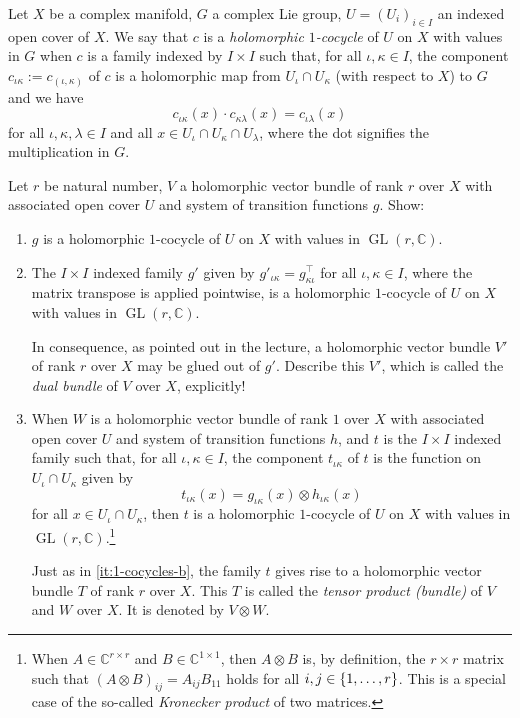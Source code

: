 \documentclass[a4paper]{amsart}
\newcommand{\C}{\mathbb{C}}
\theoremstyle{remark}
\numberwithin{equation}{question}
\DeclarePairedDelimiter\set{\{}{\}}
\DeclareMathOperator{\GL}{GL}
\begin{document}
\begin{question}[subtitle=Constructions with $1$-cocycles]
\label{qu:1-cocycles}
Let $X$ be a complex manifold, $G$ a complex Lie group, $U = (U_i)_{i \in I}$ an indexed open cover of $X$. We say that $c$ is a \emph{holomorphic $1$-cocycle} of $U$ on $X$ with values in $G$ when $c$ is a family indexed by $I \times I$ such that, for all $\iota,\kappa \in I$, the component $c_{\iota\kappa} := c_{(\iota,\kappa)}$ of $c$ is a holomorphic map from $U_\iota \cap U_\kappa$ (with respect to $X$) to $G$ and we have
\begin{equation}
\label{eq:1-cocycles}
c_{\iota\kappa}(x) \cdot c_{\kappa\lambda}(x) = c_{\iota\lambda}(x)
\end{equation}
for all $\iota,\kappa,\lambda \in I$ and all $x \in U_\iota \cap U_\kappa \cap U_\lambda$, where the dot signifies the multiplication in $G$.

Let $r$ be natural number, $V$ a holomorphic vector bundle of rank $r$ over $X$ with associated open cover $U$ and system of transition functions $g$. Show:
\begin{enumerate}
\item \label{it:1-cocycles-a} $g$ is a holomorphic $1$-cocycle of $U$ on $X$ with values in $\GL(r,\C)$.
\item \label{it:1-cocycles-b} The $I \times I$ indexed family $g'$ given by $g'_{\iota\kappa} = g_{\kappa\iota}^\top$ for all $\iota,\kappa \in I$, where the matrix transpose is applied pointwise, is a holomorphic $1$-cocycle of $U$ on $X$ with values in $\GL(r,\C)$.

In consequence, as pointed out in the lecture, a holomorphic vector bundle $V'$ of rank $r$ over $X$ may be glued out of $g'$. Describe this $V'$, which is called the \emph{dual bundle} of $V$ over $X$, explicitly!
\item When $W$ is a holomorphic vector bundle of rank $1$ over $X$ with associated open cover $U$ and system of transition functions $h$, and $t$ is the $I \times I$ indexed family such that, for all $\iota,\kappa \in I$, the component $t_{\iota\kappa}$ of $t$ is the function on $U_\iota \cap U_\kappa$ given by
\[
t_{\iota\kappa}(x) = g_{\iota\kappa}(x) \otimes h_{\iota\kappa}(x)
\]
for all $x \in U_\iota \cap U_\kappa$, then $t$ is a holomorphic $1$-cocycle of $U$ on $X$ with values in $\GL(r,\C)$.\footnote{When $A \in \C^{r \times r}$ and $B \in \C^{1\times 1}$, then $A \otimes B$ is, by definition, the $r\times r$ matrix such that $(A \otimes B)_{ij} = A_{ij}B_{11}$ holds for all $i,j \in \set{1,\dots,r}$. This is a special case of the so-called \emph{Kronecker product} of two matrices.}

Just as in \cref{it:1-cocycles-b}, the family $t$ gives rise to a holomorphic vector bundle $T$ of rank $r$ over $X$. This $T$ is called the \emph{tensor product (bundle)} of $V$ and $W$ over $X$. It is denoted by $V \otimes W$.
\end{enumerate}
\end{question}
\end{document}
